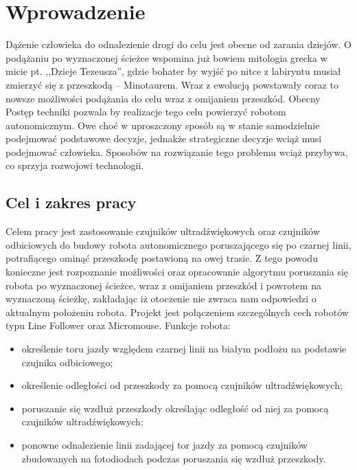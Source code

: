 \chapter{Wprowadzenie}
Dążenie człowieka do odnalezienie drogi do celu jest obecne od zarania dziejów. O podążaniu po wyznaczonej ścieżce wspomina już bowiem mitologia grecka w micie pt. ,,Dzieje Tezeusza'', gdzie bohater by wyjść po nitce z labiryntu musiał zmierzyć się z przeszkodą -- Minotaurem\cite{mitologia}. Wraz z ewolucją powstawały coraz to nowsze możliwości podążania do celu wraz z omijaniem przeszkód. Obecny Postęp techniki pozwala by realizacje tego celu powierzyć robotom autonomicznym. Owe choć w uproszczony sposób są w stanie samodzielnie podejmować podstawowe decyzje, jednakże strategiczne decyzje wciąż musi podejmować człowieka. Sposobów na rozwiązanie tego problemu wciąż przybywa, co sprzyja rozwojowi technologii.
\section{Cel i zakres pracy}
Celem pracy jest zastosowanie czujników ultradźwiękowych oraz czujników odbiciowych do budowy robota autonomicznego poruszającego się po czarnej linii, potrafiącego ominąć przeszkodę postawioną na owej trasie. Z tego powodu konieczne jest rozpoznanie możliwości oraz opracowanie algorytmu poruszania się robota po wyznaczonej ścieżce, wraz z omijaniem przeszkód i powrotem na wyznaczoną ścieżkę, zakładając iż otoczenie nie zwraca nam odpowiedzi o aktualnym położeniu robota. Projekt jest połączeniem szczególnych cech robotów typu Line Follower oraz Micromouse.
Funkcje robota:
\begin{itemize}
    \item określenie toru jazdy względem czarnej linii na białym podłożu na podstawie czujnika odbiciowego;
    \item określenie odległości od przeszkody za pomocą czujników ultradźwiękowych;
    \item poruszanie się wzdłuż przeszkody określając odległość od niej za pomocą czujników ultradźwiękowych;
    \item ponowne odnalezienie linii zadającej tor jazdy za pomocą czujników zbudowanych na fotodiodach podczas poruszania się wzdłuż przeszkody.
\end{itemize}

